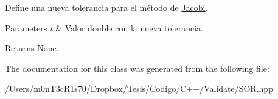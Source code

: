 Define una nueva tolerancia para el método de \hyperlink{class_jacobi}{Jacobi}. 


\begin{DoxyParams}{Parameters}
{\em t} & Valor double con la nueva tolerancia. \\
\hline
\end{DoxyParams}
\begin{DoxyReturn}{Returns}
None. 
\end{DoxyReturn}


The documentation for this class was generated from the following file\+:\begin{DoxyCompactItemize}
\item 
/\+Users/m0n\+T3c\+R1s70/\+Dropbox/\+Tesis/\+Codigo/\+C++/\+Validate/S\+O\+R.\+hpp\end{DoxyCompactItemize}
